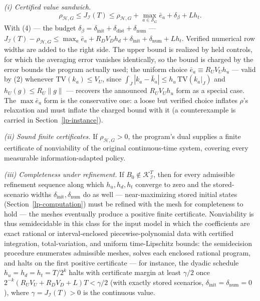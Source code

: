 \documentclass[10pt,twocolumn]{article}
\theoremstyle{plain}
\theoremstyle{definition}
\theoremstyle{remark}
\begin{document}
\noindent\emph{(i) Certified value sandwich.}
\[
\rho_{\mathcal{H},G} \le J_{\mathcal{I}}(T) \le \rho_{\mathcal{H},G}
+ \max_{a \in \mathscr{S}_G} \bar{e}_a + \delta_\beta + L h_t.
\tag{8}
\]
With (4) --- the budget \(\delta_\beta = \delta_{\mathrm{init}} +
\delta_{\mathrm{dist}} + \delta_{\mathrm{num}}\) --- \(J_{\mathcal{I}}(T) -
\rho_{\mathcal{H},G} \le \max_{a} \bar{e}_a + R_D
V_D h_d + \delta_{\mathrm{init}} + \delta_{\mathrm{num}} + L h_t\).
Verified numerical row widths are added to the right side. The upper bound
is realized by held controls, for which the averaging error vanishes
identically, so the bound is charged by the error bounds the program
actually used; the uniform choice \(\bar{e}_a \equiv R_U V_U h_u\) ---
valid by (2) whenever \(\mathrm{TV}(k_a) \le V_U\), since
\(\int_J |k_a - \bar{k}_a| \le h_u\, \mathrm{TV}(k_a|_J)\) and
\(h_U(g) \le R_U \|g\|\) --- recovers the announced
\(R_U V_U h_u\) form as a special case. The \(\max \bar{e}_a\) form is the conservative one: a loose but verified choice inflates \(\rho\)'s relaxation
and must inflate the charged bound with it (a counterexample is carried in
Section~\ref{lp-instance}).

\noindent\emph{(ii) Sound finite certificates.} If \(\rho_{\mathcal{H},G} > 0\), the
program's dual supplies a finite certificate of nonviability of the original
continuous-time system, covering every measurable information-adapted policy.

\noindent\emph{(iii) Completeness under refinement.} If
\(B_0 \notin \mathcal{K}_{\mathcal{I}}^T\), then for every admissible
refinement sequence along which \(h_u, h_d, h_t\) converge to zero and the
stored-scenario widths \(\delta_{\mathrm{init}}, \delta_{\mathrm{num}}\)
do as well --- near-maximizing stored initial states
(Section~\ref{lp-computation}) must be refined with the mesh for completeness
to hold --- the meshes eventually produce a positive
finite certificate. Nonviability is thus semidecidable in this class for
the input model in which the coefficients are exact rational or
interval-enclosed piecewise-polynomial data with certified integration,
total-variation, and uniform time-Lipschitz bounds: the semidecision
procedure enumerates admissible meshes, solves each enclosed rational
program, and halts on the first positive certificate --- for instance, the
dyadic schedule \(h_u = h_d = h_t = T/2^k\) halts with certificate margin
at least \(\gamma/2\) once \(2^{-k}(R_U V_U + R_D V_D + L)T < \gamma/2\)
(with exactly stored scenarios, \(\delta_{\mathrm{init}} =
\delta_{\mathrm{num}} = 0\)),
where \(\gamma = J_{\mathcal{I}}(T) > 0\) is the continuous value.
\end{document}
